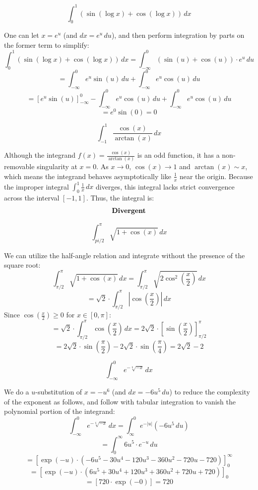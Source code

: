 \begin{questions}
    \question \[ \int_{0}^{1} (\sin(\log x) + \cos(\log x)) \,dx \]
    \begin{solution}
        One can let $x = e^u$ (and $dx = e^u \,du$), and then perform integration by parts on the former term to simplify:
        \[ \int_{0}^{1} (\sin(\log x) + \cos(\log x)) \,dx = \int_{-\infty}^{0} (\sin(u) + \cos(u)) \cdot e^u \,du \]
        \[ = \int_{-\infty}^{0} e^u \sin(u) \,du + \int_{-\infty}^{0} e^u \cos(u) \,du \]
        \[ = \left[ e^u \sin(u) \right]_{-\infty}^{0} - \int_{-\infty}^{0} e^u \cos(u) \,du + \int_{-\infty}^{0} e^u \cos(u) \,du \]
        \[ = e^0 \sin(0) = 0 \]
    \end{solution}

    \question \[ \int_{-1}^{1} \frac{\cos(x)}{\arctan(x)} \,dx \]
    \begin{solution}
        Although the integrand $f(x) = \frac{\cos(x)}{\arctan(x)}$ is an odd function, it has a non-removable singularity at $x = 0$. As $x \to 0$, $\cos(x) \to 1$ and $\arctan(x) \sim x$, which means the integrand behaves asymptotically like $\frac{1}{x}$ near the origin. Because the improper integral $\int_{0}^{1} \frac{1}{x} \,dx$ diverges, this integral lacks strict convergence across the interval $[-1, 1]$. Thus, the integral is:
        \[ \text{\textbf{Divergent}} \]
    \end{solution}

    \question \[ \int_{pi/2}^{\pi} \sqrt{1 + \cos(x)} \,dx \]
    \begin{solution}
        We can utilize the half-angle relation and integrate without the presence of the square root:
        \[ \int_{\pi/2}^{\pi} \sqrt{1 + \cos(x)} \,dx = \int_{\pi/2}^{\pi} \sqrt{2\cos^2\left(\frac{x}{2}\right)} \,dx \]
        \[ = \sqrt{2} \cdot \int_{\pi/2}^{\pi} \left| \cos\left(\frac{x}{2}\right) \right| \,dx \]
        Since $\cos\left(\frac{x}{2}\right) \ge 0$ for $x \in [0, \pi]$:
        \[ = \sqrt{2} \cdot \int_{\pi/2}^{\pi} \cos\left(\frac{x}{2}\right) \,dx = 2\sqrt{2} \cdot \left[ \sin\left(\frac{x}{2}\right) \right]_{\pi/2}^{\pi} \]
        \[ = 2\sqrt{2} \cdot \sin\left(\frac{\pi}{2}\right) - 2\sqrt{2} \cdot \sin\left(\frac{\pi}{4}\right) = 2\sqrt{2} - 2 \]
    \end{solution}

    \question \[ \int_{-\infty}^{0} e^{-\sqrt[6]{-x}} \,dx \]
    \begin{solution}
        We do a $u$-substitution of $x = -u^6$ (and $dx = -6u^5 \,du$) to reduce the complexity of the exponent as follows, and follow with tabular integration to vanish the polynomial portion of the integrand:
        \[ \int_{-\infty}^{0} e^{-\sqrt[6]{-x}} \,dx = \int_{\infty}^{0} e^{-|u|} (-6u^5 \,du) \]
        \[ = \int_{0}^{\infty} 6u^5 \cdot e^{-u} \,du \]
        \[ = \left[ \exp(-u) \cdot (-6u^5 - 30u^4 - 120u^3 - 360u^2 - 720u - 720) \right]_{0}^{\infty} \]
        \[ = \left[ \exp(-u) \cdot (6u^5 + 30u^4 + 120u^3 + 360u^2 + 720u + 720) \right]_{0} \]
        \[ = [720 \cdot \exp(-0)] = 720 \]
    \end{solution}


\end{questions}
